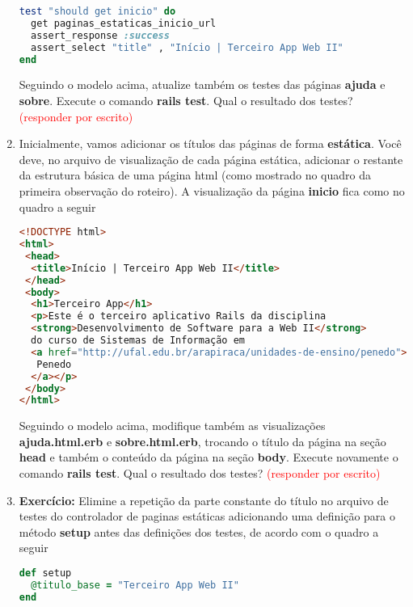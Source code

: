 \documentclass[a4paper,12pt]{article}
\begin{document}
\begin{enumerate}
  \begin{lstlisting}[language=Ruby, title={test/controllers/paginas\_estaticas\_controller\_test.rb}]
test "should get inicio" do
  get paginas_estaticas_inicio_url
  assert_response :success
  assert_select "title" , "Início | Terceiro App Web II"
end
  \end{lstlisting}

  Seguindo o modelo acima, atualize também os testes das páginas \textbf{ajuda} e \textbf{sobre}. Execute o comando \textbf{rails test}. Qual o resultado dos testes? \textcolor{red}{(responder por escrito)}

  \item Inicialmente, vamos adicionar os títulos das páginas de forma \textbf{estática}. Você deve, no arquivo de visualização de cada página estática, adicionar o restante da estrutura básica de uma página html (como mostrado no quadro da primeira observação do roteiro). A visualização da página \textbf{inicio} fica como no quadro a seguir

  \begin{lstlisting}[language=html, title=app/views/paginas\_estaticas/inicio.html.erb]
<!DOCTYPE html>
<html>
 <head>
  <title>Início | Terceiro App Web II</title>
 </head>
 <body>
  <h1>Terceiro App</h1>
  <p>Este é o terceiro aplicativo Rails da disciplina
  <strong>Desenvolvimento de Software para a Web II</strong>
  do curso de Sistemas de Informação em
  <a href="http://ufal.edu.br/arapiraca/unidades-de-ensino/penedo">
   Penedo
  </a></p>
 </body>
</html>
  \end{lstlisting}

  Seguindo o modelo acima, modifique também as visualizações \textbf{ajuda.html.erb} e \textbf{sobre.html.erb}, trocando o título da página na seção \textbf{head} e também o conteúdo da página na seção \textbf{body}. Execute novamente o comando \textbf{rails test}. Qual o resultado dos testes? \textcolor{red}{(responder por escrito)}

  \item \textbf{Exercício:} Elimine a repetição da parte constante do título no arquivo de testes do controlador de paginas estáticas adicionando uma definição para o método \textbf{setup} antes das definições dos testes, de acordo com o quadro a seguir

  \begin{lstlisting}[language=Ruby, title={test/controllers/paginas\_estaticas\_controller\_test.rb}]
def setup
  @titulo_base = "Terceiro App Web II"
end


\end{lstlisting}
\end{enumerate}
\end{document}
